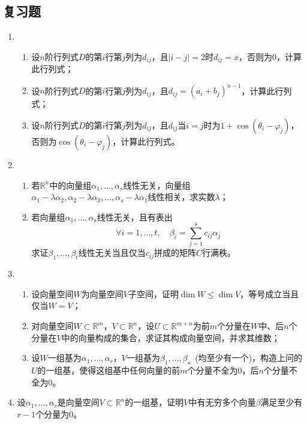 \documentclass[a4paper,UTF8,fontset=windows]{ctexart}
\begin{document}
\subsection{复习题}
\begin{enumerate}
    \item 
    \begin{enumerate}[(1)]
        \item 设$n$阶行列式$D$的第$i$行第$j$列为$d_{ij}$，且$|i-j|=2$时$d_{ij}=x$，否则为0，计算此行列式；
        \item 设$n$阶行列式$D$的第$i$行第$j$列为$d_{ij}$，且$d_{ij}=(a_i+b_j)^{n-1}$，计算此行列式；
        \item 设$n$阶行列式$D$的第$i$行第$j$列为$d_{ij}$，且$d_{ij}$当$i=j$时为$1+\cos(\theta_i-\varphi_j)$，否则为$\cos(\theta_i-\varphi_j)$，计算此行列式。
    \end{enumerate}

    \item \begin{enumerate}[(1)]
        \item 若$\mathbb{R}^n$中的向量组$\alpha_1,\dots,\alpha_s$线性无关，向量组$\alpha_1-\lambda\alpha_2,\alpha_2-\lambda\alpha_3,\dots,\alpha_s-\lambda\alpha_1$线性相关，求实数$\lambda$；
        \item 若向量组$\alpha_1,\dots,\alpha_s$线性无关，且有表出
        $$\forall i=1,\dots,t,\quad\beta_i=\sum_{j=1}^sc_{ij}\alpha_j$$
        求证$\beta_1,\dots,\beta_t$线性无关当且仅当$c_{ij}$拼成的矩阵$C$行满秩。
    \end{enumerate}

    \item
    \begin{enumerate}[(1)]
        \item 设向量空间$W$为向量空间$V$子空间，证明$\dim W\le\dim V$，等号成立当且仅当$W=V$；
        \item 对向量空间$W\subset\mathbb{R}^m$，$V\subset\mathbb{R}^n$，设$U\subset\mathbb{R}^{m+n}$为前$m$个分量在$W$中、后$n$个分量在$V$中的向量构成的集合，求证其构成向量空间，并求其维数；
        \item 设$W$一组基为$\alpha_1,\dots,\alpha_r$，$V$一组基为$\beta_1,\dots,\beta_s$\ (均至少有一个)，构造上问的$U$的一组基，使得这组基中任何向量的前$m$个分量不全为0，后$n$个分量不全为0。
    \end{enumerate}

    \item 设$\alpha_1,\dots,\alpha_r$是向量空间$V\subset\mathbb{R}^n$的一组基，证明$V$中有无穷多个向量$\beta$满足至少有$r-1$个分量为0。
    

\end{enumerate}
\end{document}
